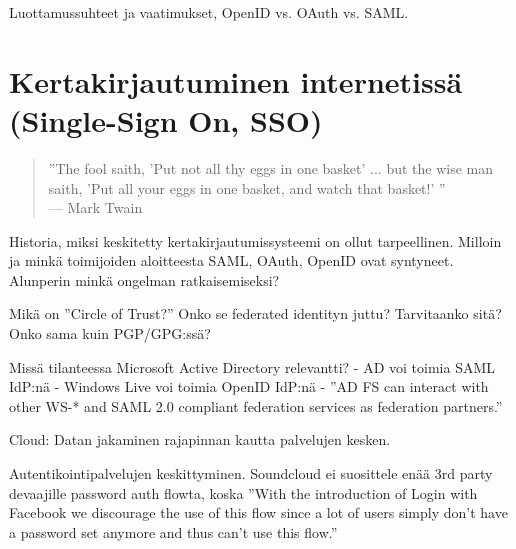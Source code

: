 \documentclass[finnish,gradu]{tktltiki}
\begin{document}
  Luottamussuhteet ja vaatimukset, OpenID vs. OAuth vs. SAML.



\section{Kertakirjautuminen internetissä (Single-Sign On, SSO)} %
\label{sec:Kertakirjautumisstandardit}
  \begin{quote}
      ''The fool saith, 'Put not all thy eggs in one basket' ...
      but the wise man saith, 'Put all your eggs in one basket, and watch that basket!' ''
      \\--- Mark Twain \cite{twain_eggs_1894}
  \end{quote}

  Historia, miksi keskitetty kertakirjautumissysteemi on ollut tarpeellinen.
  Milloin ja minkä toimijoiden aloitteesta SAML, OAuth, OpenID ovat syntyneet. Alunperin minkä ongelman ratkaisemiseksi?


  Mikä on ''Circle of Trust?'' Onko se federated identityn juttu? Tarvitaanko sitä? Onko sama kuin PGP/GPG:ssä?

  Missä tilanteessa Microsoft Active Directory relevantti?
  - AD voi toimia SAML IdP:nä
  - Windows Live voi toimia OpenID IdP:nä
  - ''AD FS can interact with other WS-* and SAML 2.0 compliant federation services as federation partners.''

  Cloud: Datan jakaminen rajapinnan kautta palvelujen kesken.

  Autentikointipalvelujen keskittyminen. Soundcloud ei suosittele enää 3rd party devaajille password auth flowta, koska ''With the introduction of Login with Facebook we discourage the use of this flow since a lot of users simply don't have a password set anymore and thus can't use this flow.''
\end{document}
